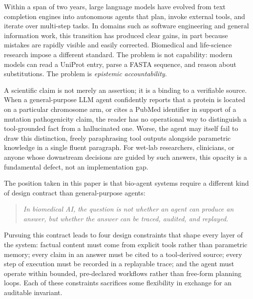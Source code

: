 \documentclass[11pt,letterpaper]{article}
\begin{document}
Within a span of two years, large language models have evolved from text completion engines into autonomous agents that plan, invoke external tools, and iterate over multi-step tasks. In domains such as software engineering and general information work, this transition has produced clear gains, in part because mistakes are rapidly visible and easily corrected. Biomedical and life-science research impose a different standard. The problem is not capability: modern models can read a UniProt entry, parse a FASTA sequence, and reason about substitutions. The problem is \emph{epistemic accountability}.

A scientific claim is not merely an assertion; it is a binding to a verifiable source. When a general-purpose LLM agent confidently reports that a protein is located on a particular chromosome arm, or cites a PubMed identifier in support of a mutation pathogenicity claim, the reader has no operational way to distinguish a tool-grounded fact from a hallucinated one. Worse, the agent may itself fail to draw this distinction, freely paraphrasing tool outputs alongside parametric knowledge in a single fluent paragraph. For wet-lab researchers, clinicians, or anyone whose downstream decisions are guided by such answers, this opacity is a fundamental defect, not an implementation gap.

The position taken in this paper is that bio-agent systems require a different kind of design contract than general-purpose agents:

\begin{quote}
\emph{In biomedical AI, the question is not whether an agent can produce an answer, but whether the answer can be traced, audited, and replayed.}
\end{quote}

Pursuing this contract leads to four design constraints that shape every layer of the system: factual content must come from explicit tools rather than parametric memory; every claim in an answer must be cited to a tool-derived source; every step of execution must be recorded in a replayable trace; and the agent must operate within bounded, pre-declared workflows rather than free-form planning loops. Each of these constraints sacrifices some flexibility in exchange for an auditable invariant.
\end{document}
